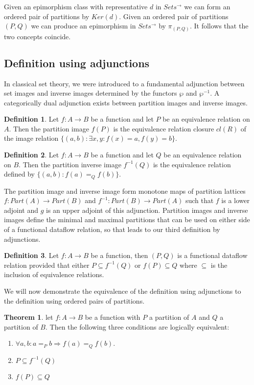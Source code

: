 \documentclass[a4paper,11pt, notitlepage]{report}
\theoremstyle{definition}
\newtheorem{definition}{Definition}[section]
\newtheorem{theorem}{Theorem}[section]
\begin{document}
Given an epimorphism class with representative $d$ in $Sets^{\to}$ we can form an ordered pair of partitions by $Ker(d)$. Given an ordered pair of partitions $(P,Q)$ we can produce an epimorphism in $Sets^{\to}$ by $\pi_{(P,Q)}$. It follows that the two concepts coincide.

\subsection{Definition using adjunctions}
In classical set theory, we were introduced to a fundamental adjunction between set images and inverse images determined by the functors $\wp$ and $\wp^{-1}$. A categorically dual adjunction exists between partition images and inverse images.

\begin{definition}
Let $f: A \to B$ be a function and let $P$ be an equivalence relation on $A$. Then the partition image $f(P)$ is the equivalence relation closure $cl(R)$ of the image relation $\{(a,b) : \exists x,y : f(x) = a, f(y) = b \}$.
\end{definition}

\begin{definition}
Let $f: A \to B$ be a function and let $Q$ be an equivalence relation on $B$. Then the partition inverse image $f^{-1}(Q)$ is the equivalence relation defined by $\{(a,b) : f(a) =_Q f(b) \}$.
\end{definition}

The partition image and inverse image form monotone maps of partition lattices $f: Part(A) \to Part(B)$ and $f^{-1}: Part(B) \to Part(A)$ such that $f$ is a lower adjoint and $g$ is an upper adjoint of this adjunction. Partition images and inverse images define the minimal and maximal partitions that can be used on either side of a functional dataflow relation, so that leads to our third definition by adjunctions.

\begin{definition}
Let $f: A \to B$ be a function, then $(P,Q)$ is a functional dataflow relation provided that either $P \subseteq f^{-1}(Q)$ or $f(P) \subseteq Q$ where $\subseteq$ is the inclusion of equivalence relations.
\end{definition}

We will now demonstrate the equivalence of the definition using adjunctions to the definition using ordered pairs of partitions.

\begin{theorem} let $f: A \to B$ be a function with $P$ a partition of $A$ and $Q$ a partition of $B$. Then the following three conditions are logically equivalent:

\begin{enumerate}
 \item $\forall a,b: a =_P b \Rightarrow f(a) =_Q f(b)$.
 \item $P \subseteq f^{-1}(Q)$
 \item $f(P) \subseteq Q$
\end{enumerate}

\end{theorem}
\end{document}
